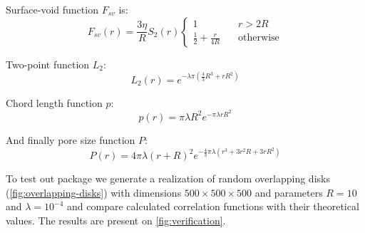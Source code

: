 \documentclass[reprint,amsmath,amssymb,aps,pre,showkeys,showpacs,nofootinbib]{revtex4-1}
\begin{document}
Surface-void function $F_{sv}$ is:
\begin{equation*}
  F_{sv}(r) = \frac{3\eta}{R} S_2(r) \left\{
  \begin{array}{ll}
    1 & \quad r > 2R \\
    \frac{1}{2} + \frac{r}{4R} & \quad \text{otherwise}
  \end{array}
  \right.
\end{equation*}

Two-point function $L_2$:
\begin{equation*}
  L_2(r) = e^{-\lambda\pi (\frac{4}{3}R^3 + rR^2)}
\end{equation*}

Chord length function $p$:
\begin{equation*}
  p(r) = \pi\lambda R^2 e^{-\pi\lambda rR^2}
\end{equation*}

And finally pore size function $P$:
\begin{equation*}
  P(r) = 4\pi\lambda(r+R)^2 e^{-\frac{4}{3}\pi\lambda (r^3 + 3r^2R + 3rR^2)}
\end{equation*}

To test out package we generate a realization of random overlapping disks
(\cref{fig:overlapping-disks}) with dimensions $500 \times 500 \times 500$ and
parameters $R = 10$ and $\lambda = 10^{-4}$ and compare calculated correlation
functions with their theoretical values. The results are present on
\cref{fig:verification}.
\end{document}
